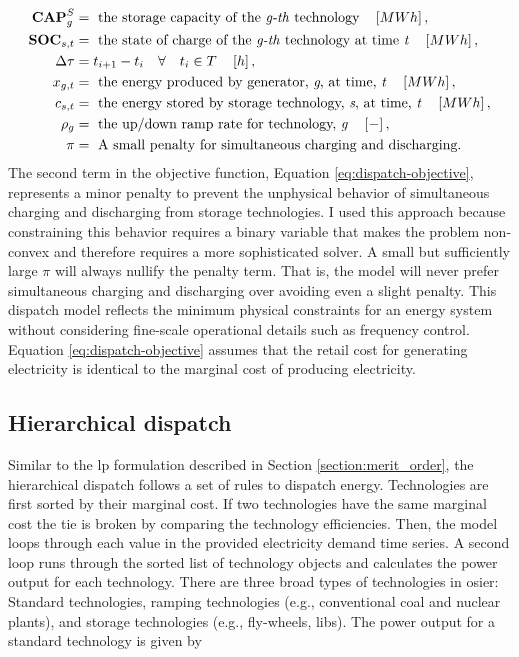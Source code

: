 \begin{align}
    \textbf{CAP}^S_g &= \text{ the storage capacity of the \textit{g-th} technology}\quad \left[MWh\right],\nonumber\\
    \textbf{SOC}_{s,t} &= \text{ the state of charge of the \textit{g-th} technology at time \textit{t}}\quad \left[MWh\right]\nonumber,\\
    \Delta\tau &= t_{i+1} - t_i \quad \forall \quad t_i \in T \quad \left[h\right],\nonumber\\
    x_{g,t} &= \text{ the energy produced by generator, \textit{g}, at time, \textit{t}}\quad \left[MWh\right]\nonumber,\\
    c_{s,t} &= \text{ the energy stored by storage technology, \textit{s}, at time, \textit{t}}\quad \left[MWh\right]\nonumber,\\
    \rho_g &= \text{ the up/down ramp rate for technology, \textit{g}} \quad \left[-\right]\nonumber,\\
    \pi &= \text{ A small penalty for simultaneous charging and discharging.}\nonumber
\end{align}
The second term in the objective function, Equation \ref{eq:dispatch-objective},
represents a minor penalty to prevent the unphysical behavior of simultaneous
charging and discharging from storage technologies. I used this approach because
constraining this behavior requires a binary variable that makes the problem
non-convex and therefore requires a more sophisticated solver. A small but
sufficiently large $\pi$ will always nullify the penalty term. That is,
the model will never prefer simultaneous charging and discharging over avoiding 
even a slight penalty. This dispatch
model reflects the minimum physical constraints for an energy system without
considering fine-scale operational details such as frequency control. Equation
\ref{eq:dispatch-objective} assumes that the retail cost for generating
electricity is identical to the marginal cost of producing electricity. 

\subsection{Hierarchical dispatch}

Similar to the \ac{lp} formulation described in Section
\ref{section:merit_order}, the hierarchical dispatch follows a set of rules to
dispatch energy. Technologies are first sorted by their marginal cost. If two
technologies have the same marginal cost the tie is broken by comparing the 
technology efficiencies. Then, the model loops through each value in the provided 
electricity demand time series. A second loop runs through the sorted list of 
technology objects and calculates the power output for each technology. There
are three broad types of technologies in \ac{osier}: Standard technologies,
ramping technologies (e.g.,  conventional coal and nuclear plants), and storage 
technologies (e.g., fly-wheels, \acp{lib}). The power output for a standard 
technology is given by

